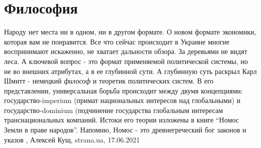  
 
 
 
 
\chapter{Философия}

Народу нет места ни в одном, ни в другом формате.  О новом формате экономики,
которая вам не понравится.  Все что сейчас происходит в Украине многие
воспринимают искаженно, не хватает дальности обзора.  За деревьями не видят
леса.  А ключевой вопрос - это формат применяемой политической системы, но не
во внешних атрибутах, а в ее глубинной сути.  А глубинную суть раскрыл Карл
Шмитт - немецкий \emph{философ} и теоретик политических систем.  В его
представлении, универсальная борьба происходит между двумя концепциями:
государство-imperium (примат национальных интересов над глобальными) и
государство-dominium (подчинение государства глобальным интересам
транснациональных компаний.  Истоки его теории изложены в книге \enquote{Номос
Земли в праве народов}. Напомню, Номос - это древнегреческий бог законов и
указов
, 
Алексей Кущ, strana.ua, 17.06.2021

